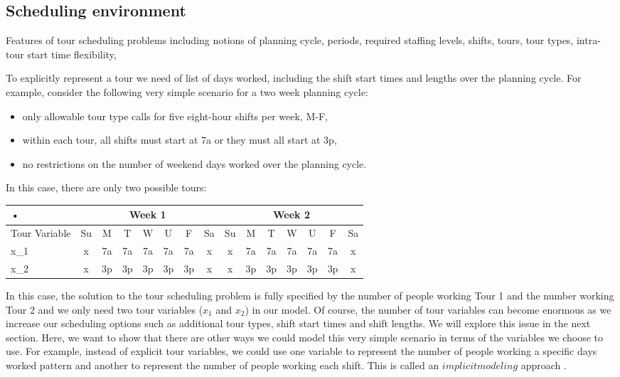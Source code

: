 \documentclass{article}
\begin{document}
\subsection{Scheduling environment}

Features of tour scheduling problems including notions of planning cycle, periods, required staffing levels, shifts, tours, tour types, intra-tour start time flexibility, 

To explicitly represent a tour we need of list of days worked, including the shift start times and lengths over the planning cycle. For example, consider the following very simple scenario for a two week planning cycle:

\begin{itemize}
\item only allowable tour type calls for five eight-hour shifts per week, M-F,
\item within each tour, all shifts must start at 7a or they must all start at 3p,
\item no restrictions on the number of weekend days worked over the planning cycle.
\end{itemize}

In this case, there are only two possible tours:

\begin{tabular}{|l|c|c|c|c|c|c|c|c|c|c|c|c|c|c|}
\hline 
• & \multicolumn{7}{c|}{Week 1} & \multicolumn{7}{c|}{Week 2} \\ 
\hline 
Tour Variable & Su & M & T & W & U & F & Sa & Su & M & T & W & U & F & Sa \\ 
\hline 
x_1 & x & 7a & 7a & 7a & 7a & 7a & x & x & 7a & 7a & 7a & 7a & 7a & x \\ 
\hline 
x_2 & x & 3p & 3p & 3p & 3p & 3p & x & x & 3p & 3p & 3p & 3p & 3p & x \\ 
\hline 
\end{tabular} 

In this case, the solution to the tour scheduling problem is fully specified by the number of people working Tour 1 and the number working Tour 2 and we only need two tour variables ($x_1$ and $x_2$) in our model. Of course, the number of tour variables can become enormous as we increase our scheduling options such as additional tour types, shift start times and shift lengths. We will explore this issue in the next section. Here, we want to show that there are other ways we could model this very simple scenario in terms of the variables we choose to use. For example, instead of explicit tour variables, we could use one variable to represent the number of people working a specific days worked pattern and another to represent the number of people working each shift. This is called an $implicit modeling$ approach \cite{}.
\end{document}
